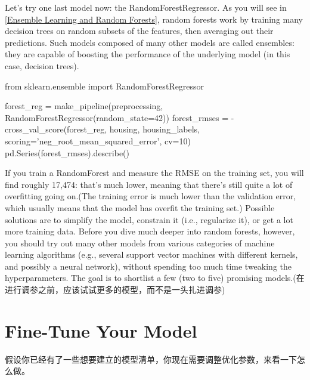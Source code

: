 Let's try one last model now: the RandomForestRegressor. As you will see in \autoref{Ensemble Learning and Random Forests}, random forests work by training many decision trees on random subsets of the features, then averaging out their predictions. Such models composed of many other models are called ensembles: they are capable of boosting the performance of the underlying model (in this case, decision trees). 

\begin{pyc}
from sklearn.ensemble import RandomForestRegressor

forest_reg = make_pipeline(preprocessing,
                           RandomForestRegressor(random_state=42))
forest_rmses = - cross_val_score(forest_reg, 
                                 housing, 
                                 housing_labels,
                                 scoring='neg_root_mean_squared_error',
                                 cv=10)
pd.Series(forest_rmses).describe()
\end{pyc}
If you train a RandomForest and measure the RMSE on the training set, you will find roughly 17,474: that's much lower, meaning that there's still quite a lot of overfitting going on.(The training error is much lower than the validation error, which usually means that the model has overfit the training set.) Possible solutions are to simplify the model, constrain it (i.e., regularize it), or get a lot more training data. Before you dive much deeper into random forests, however, you should try out many other models from various categories of machine learning algorithms (e.g., several support vector machines with different kernels, and possibly a neural network), without spending too much time tweaking the hyperparameters. The goal is to shortlist a few (two to five) promising models.(在进行调参之前，应该试试更多的模型，而不是一头扎进调参)

\section{Fine-Tune Your Model}
假设你已经有了一些想要建立的模型清单，你现在需要调整优化参数，来看一下怎么做。
